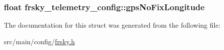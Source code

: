 \hypertarget{structfrsky__telemetry__config_adc73405ceebaf05d8a676ee3971643e5}{
\subsubsection[{gps\+No\+Fix\+Longitude}]{\setlength{\rightskip}{0pt plus 5cm}float frsky\+\_\+telemetry\+\_\+config\+::gps\+No\+Fix\+Longitude}}\label{structfrsky__telemetry__config_adc73405ceebaf05d8a676ee3971643e5}


The documentation for this struct was generated from the following file\+:\begin{DoxyCompactItemize}
\item 
src/main/config/\hyperlink{config_2frsky_8h}{frsky.\+h}\end{DoxyCompactItemize}
